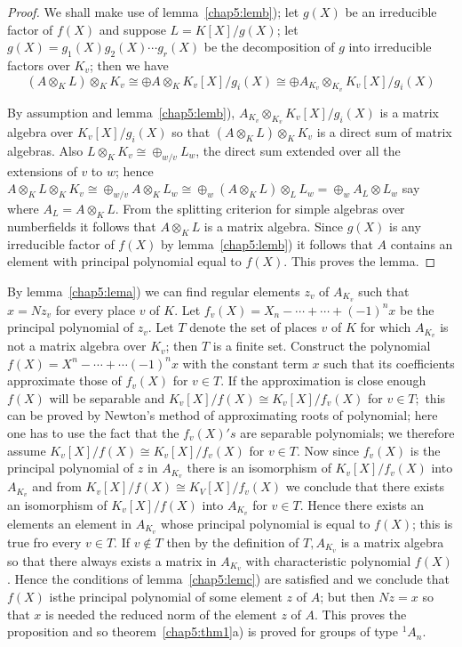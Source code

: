  \begin{proof}
We shall make use of lemma~\ref{chap5:lemb}); let $g(X)$ be an irreducible factor
of $f(X)$ and suppose $L=K[X]/g(X)$; let $g(X)=g_1(X)g_2(X) \cdots
g_r(X)$ be the decomposition of $g$ into irreducible factors over
$K_v$; then we have  
$$
(A \otimes_K L) \otimes_KK_v \cong \oplus A \otimes_K K_v[X]/g_i(X)
\cong \oplus A_{K_v}\otimes_{K_v} K_v[X]/g_i(X) 
$$

\noindent
By assumption and lemma~\ref{chap5:lemb}), $A_{K_v}\otimes_{K_v} K_v[X]/g_i (X)$ is
a matrix algebra over $K_v[X]/g_i(X)$ so that $(A \otimes_KL)
 \otimes_KK_v$ is a direct sum of matrix algebras. Also $L
\otimes_KK_v \cong \oplus_{w/v} L_w$, the direct sum extended over all
the extensions of $v$ to $w$; hence 
 $A \otimes_K L \otimes_K K_v \cong \oplus_{w/v} A \otimes_KL_w \cong
\oplus_w (A \otimes_KL) \otimes_L L_w= \oplus_w A_L \otimes L_w$ say
where $A_L=A \otimes_KL$. From the splitting criterion for simple
algebras over number\pageoriginale fields it follows that $A \otimes_KL$ is a
matrix algebra. Since $g(X)$ is any irreducible factor of $f(X)$ by
lemma~\ref{chap5:lemb}) it follows that $A$ contains an element with principal
polynomial equal to $f(X)$. This proves the lemma. 
 \end{proof}


 \begin{proofofproposition}\label{chap5:prfprop1}%
By lemma~\ref{chap5:lema}) we can find regular elements $z_v$ of $A_{K_v}$ such
that $x=Nz_v$ for every place $v$ of $K$. Let $f_v(X)=X_n - \cdots +
\cdots + (-1)^nx$ be the principal polynomial of $z_v$. Let $T$ denote
the set of places $v$ of $K$ for which $A_{K_v}$ is not a matrix
algebra over $K_v$; then $T$ is a finite set. Construct the polynomial
$f(X)=X^n - \cdots + \cdots (-1)^n x$ with the constant term $x$ such
that its coefficients approximate those of $f_v(X)$ for $v \in T$. If
the approximation is close enough $f(X)$ will be separable and
$K_v[X]/f(X) \cong K_v[X]/f_v(X)$ for $v \in T;$ this can be proved by
Newton's method of approximating roots of polynomial; here one has to
use the fact that the $f_v(X)'s$ are separable polynomials; we
therefore assume $K_v[X]/f(X) \cong K_v[X]/f_v(X)$ for $v \in T$. Now
since $f_v(X)$ is the principal polynomial of $z$ in $A_{K_v}$ there is an
isomorphism of $K_v[X]/f_v(X)$ into $A_{K_v}$ and from $K_v[X]/f(X)
\cong K_V[X]/f_v(X)$ we conclude that there exists an isomorphism of
$K_v[X]/f(X)$ into $A_{K_v}$ for $v \in T$. Hence there exists an
elements an element in $A_{K_v}$ whose principal polynomial is equal
to $f(X)$; this  is true fro every $v \in T$. If $v \notin T$ then by the
definition of $T, A_{K_v}$ is a matrix algebra so that there always
exists a matrix in $A_{K_v}$ with characteristic polynomial
$f(X)$. Hence the conditions of lemma~\ref{chap5:lemc}) are satisfied and we
conclude that $f(X)$ is\pageoriginale the principal polynomial of some
element $z$ 
of $A$; but then  $Nz =x$ so that $x$ is needed the reduced norm of
the element $z$ of $A$. This proves the proposition and so 
theorem~\ref{chap5:thm1}a) is proved for groups of type $^1A_n$.   
\end{proofofproposition} 

